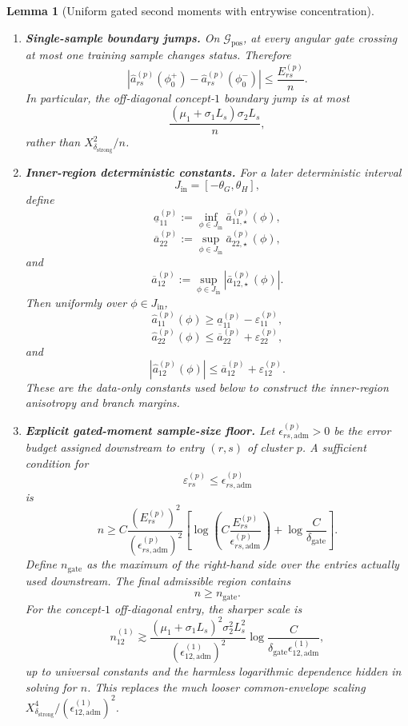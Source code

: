\documentclass{article} %
\theoremstyle{plain}
\newtheorem{lemma}[theorem]{Lemma}
\theoremstyle{definition}
\theoremstyle{remark}
\begin{document}
\begin{lemma}[Uniform gated second moments with entrywise concentration]
\begin{enumerate}[label=\textnormal{(\roman*)},leftmargin=2.4em]
\item
\textbf{Single-sample boundary jumps.}
On $\mathcal G_{\mathrm{pos}}$, at every angular gate crossing at most one
training sample changes status. Therefore
\[
\boxed{
\left|
\widehat a_{rs}^{(p)}(\phi_0^+)
-
\widehat a_{rs}^{(p)}(\phi_0^-)
\right|
\le
\frac{E_{rs}^{(p)}}{n}.
}
\tag{gate-jump}
\]
In particular, the off-diagonal concept-$1$ boundary jump is at most
\[
\boxed{
\frac{
(\mu_1+\sigma_1L_s)\sigma_2L_s
}{n},
}
\]
rather than $X_{\delta_{\mathrm{strong}}}^2/n$.

\item
\textbf{Inner-region deterministic constants.}
For a later deterministic interval
\[
J_{\mathrm{in}}
=
[-\theta_G,\theta_H],
\]
define
\[
\underline a_{11}^{(p)}
:=
\inf_{\phi\in J_{\mathrm{in}}}
\bar a_{11,\star}^{(p)}(\phi),
\]
\[
\overline a_{22}^{(p)}
:=
\sup_{\phi\in J_{\mathrm{in}}}
\bar a_{22,\star}^{(p)}(\phi),
\]
and
\[
\overline a_{12}^{(p)}
:=
\sup_{\phi\in J_{\mathrm{in}}}
\left|
\bar a_{12,\star}^{(p)}(\phi)
\right|.
\]
Then uniformly over $\phi\in J_{\mathrm{in}}$,
\[
\boxed{
\widehat a_{11}^{(p)}(\phi)
\ge
\underline a_{11}^{(p)}
-
\varepsilon_{11}^{(p)},
}
\]
\[
\boxed{
\widehat a_{22}^{(p)}(\phi)
\le
\overline a_{22}^{(p)}
+
\varepsilon_{22}^{(p)},
}
\]
and
\[
\boxed{
\left|
\widehat a_{12}^{(p)}(\phi)
\right|
\le
\overline a_{12}^{(p)}
+
\varepsilon_{12}^{(p)}.
}
\]
These are the data-only constants used below to construct the inner-region
anisotropy and branch margins.

\item
\textbf{Explicit gated-moment sample-size floor.}
Let $\epsilon_{rs,\mathrm{adm}}^{(p)}>0$ be the error budget assigned
downstream to entry $(r,s)$ of cluster $p$. A sufficient condition for
\[
\varepsilon_{rs}^{(p)}
\le
\epsilon_{rs,\mathrm{adm}}^{(p)}
\]
is
\[
\boxed{
n
\ge
C
\frac{(E_{rs}^{(p)})^2}{(\epsilon_{rs,\mathrm{adm}}^{(p)})^2}
\left[
\log\left(
C\frac{E_{rs}^{(p)}}{\epsilon_{rs,\mathrm{adm}}^{(p)}}
\right)
+
\log\frac{C}{\delta_{\mathrm{gate}}}
\right].
}
\tag{gate-sample-floor}
\]
Define $n_{\mathrm{gate}}$ as the maximum of the right-hand side over the
entries actually used downstream. The final admissible region contains
\[
\boxed{n\ge n_{\mathrm{gate}}.}
\]
For the concept-$1$ off-diagonal entry, the sharper scale is
\[
\boxed{
n_{12}^{(1)}
\gtrsim
\frac{
(\mu_1+\sigma_1L_s)^2\sigma_2^2L_s^2
}{(\epsilon_{12,\mathrm{adm}}^{(1)})^2}
\log
\frac{C}{
\delta_{\mathrm{gate}}\epsilon_{12,\mathrm{adm}}^{(1)}
},
}
\tag{offdiag-sample-floor}
\]
up to universal constants and the harmless logarithmic dependence hidden in
solving for $n$.  This replaces the much looser common-envelope scaling
$X_{\delta_{\mathrm{strong}}}^4/(\epsilon_{12,\mathrm{adm}}^{(1)})^2$.

\end{enumerate}
\end{lemma}
\end{document}
